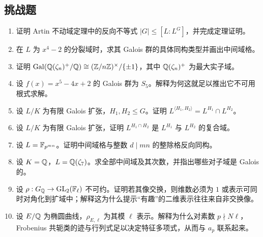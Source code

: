 \subsection*{挑战题}
\begin{enumerate}[resume, label=\textbf{\arabic*.}, leftmargin=*, itemsep=0.5em]
\item \hard 证明 Artin 不动域定理中的反向不等式 $|G|\le [L:L^G]$，并完成定理证明。
\item \hard 在 $L$ 为 $x^4-2$ 的分裂域时，求其 Galois 群的具体同构类型并画出中间域格。
\item \hard 证明 $\mathrm{Gal}(\mathbb{Q}(\zeta_n)^+/\mathbb{Q})\cong (\mathbb{Z}/n\mathbb{Z})^\times/\{\pm1\}$，其中 $\mathbb{Q}(\zeta_n)^+$ 为最大实子域。
\item \hard 设 $f(x)=x^5-4x+2$ 的 Galois 群为 $S_5$。解释为何这就足以推出它不可用根式求解。
\item \hard 设 $L/K$ 为有限 Galois 扩张，$H_1,H_2\le G$。证明 $L^{\langle H_1,H_2\rangle}=L^{H_1}\cap L^{H_2}$。
\item \hard 设 $L/K$ 为有限 Galois 扩张，证明 $L^{H_1\cap H_2}$ 是 $L^{H_1}$ 与 $L^{H_2}$ 的复合域。
\item \hard 设 $L=\mathbb{F}_{p^{mn}}$。证明中间域格与整数 $d\mid mn$ 的整除格反向同构。
\item \hard 设 $K=\mathbb{Q}$，$L=\mathbb{Q}(\zeta_7)$。求全部中间域及其次数，并指出哪些对子域是 Galois 的。
\item \hard 设 $\rho:G_{\mathbb{Q}}\to \mathrm{GL}_2(\mathbb{F}_\ell)$ 不可约。证明若其像交换，则维数必须为 $1$ 或表示可同时对角化到扩域中；解释这为什么提示“有趣”的二维表示往往来自非交换像。
\item \hard 设 $E/\mathbb{Q}$ 为椭圆曲线，$\rho_{E,\ell}$ 为其模 $\ell$ 表示。解释为什么对素数 $p\nmid N\ell$，Frobenius 共轭类的迹与行列式足以决定特征多项式，从而与 $a_p$ 联系起来。
\end{enumerate}

